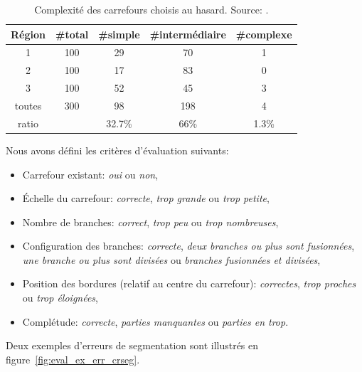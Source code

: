 \begin{table}[ht]
    \centering
    \footnotesize
    \begin{tabular}{c|c|c|c|c}
    Région & \#total & \#simple &\#intermédiaire& \#complexe \\
    \hline
     1 & 100 & 29 & 70 & 1 \\
     2 & 100 & 17 & 83 & 0 \\
     3 & 100 & 52 & 45 & 3 \\
     \hline
     toutes & 300 & 98 & 198 & 4 \\
     \hline
     ratio & &  32.7\% & 66\% & 1.3\%\\
    \end{tabular}
    \caption[Complexité des carrefours choisis au hasard]{Complexité des carrefours choisis au hasard. Source: \citep{Favreau2022}.}
    \label{tab:selectedRegions}
\end{table}

\newpar{}

Nous avons défini les critères d'évaluation suivants:
\begin{itemize}
    \item Carrefour existant: \textit{oui} ou \textit{non},
    \item Échelle du carrefour: \textit{correcte}, \textit{trop grande} ou \textit{trop petite},
    \item Nombre de branches: \textit{correct}, \textit{trop peu} ou \textit{trop nombreuses},
    \item Configuration des branches: \textit{correcte}, \textit{deux branches ou plus sont fusionnées}, \textit{une branche ou plus sont divisées} ou \textit{branches fusionnées et divisées},
    \item Position des bordures (relatif au centre du carrefour): \textit{correctes}, \textit{trop proches} ou \textit{trop éloignées},
    \item Complétude: \textit{correcte}, \textit{parties manquantes} ou \textit{parties en trop}.
\end{itemize}

\newpar{}

Deux exemples d'erreurs de segmentation sont illustrés en figure~\ref{fig:eval_ex_err_crseg}.

